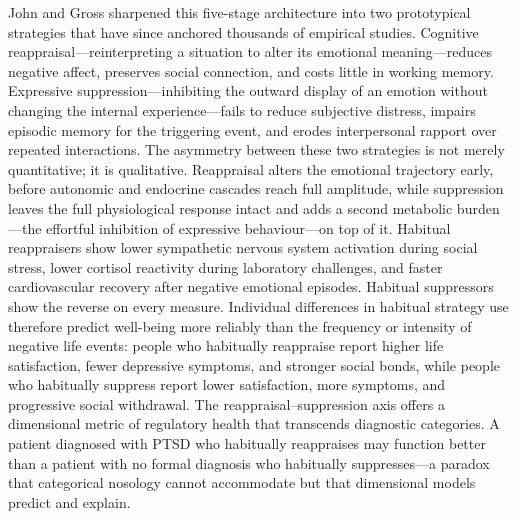 John and Gross sharpened this five-stage architecture into two prototypical
strategies that have since anchored thousands of empirical
studies.  Cognitive reappraisal---reinterpreting a situation to alter
its emotional meaning---reduces negative affect, preserves social
connection, and costs little in working memory.  Expressive
suppression---inhibiting the outward display of an emotion without changing
the internal experience---fails to reduce subjective distress, impairs
episodic memory for the triggering event, and erodes interpersonal rapport
over repeated interactions.  The asymmetry between these two strategies is
not merely quantitative; it is qualitative.  Reappraisal alters the
emotional trajectory early, before autonomic and endocrine cascades reach
full amplitude, while suppression leaves the full physiological response
intact and adds a second metabolic burden---the effortful inhibition of
expressive behaviour---on top of it.  Habitual reappraisers show lower
sympathetic nervous system activation during social stress, lower cortisol
reactivity during laboratory challenges, and faster cardiovascular recovery
after negative emotional episodes.  Habitual suppressors show the reverse
on every measure.  Individual differences in habitual strategy use
therefore predict well-being more reliably than the frequency or intensity
of negative life events: people who habitually reappraise report higher
life satisfaction, fewer depressive symptoms, and stronger social bonds,
while people who habitually suppress report lower satisfaction, more
symptoms, and progressive social withdrawal.  The reappraisal--suppression
axis offers a dimensional metric of regulatory health that transcends
diagnostic categories.  A patient diagnosed with PTSD who habitually
reappraises may function better than a patient with no formal diagnosis who
habitually suppresses---a paradox that categorical nosology cannot
accommodate but that dimensional models predict and explain.

